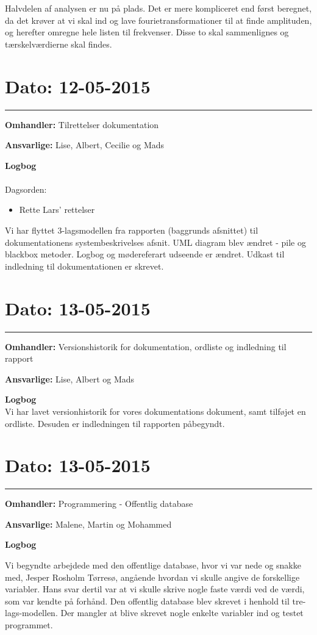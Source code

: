Halvdelen af analysen er nu på plads. Det er mere kompliceret end først beregnet, da det krøver at vi skal ind og lave fourietransformationer til at finde amplituden, og herefter omregne hele listen til frekvenser. Disse to skal sammenlignes og tærskelværdierne skal findes. 


\section{Dato: 12-05-2015}
\hrule
\textbf{Omhandler:} Tilrettelser dokumentation

\textbf{Ansvarlige:} Lise, Albert, Cecilie og Mads

\textbf{Logbog}
\\
\\
Dagsorden:
\begin{itemize}
	\item Rette Lars' rettelser
\end{itemize}

Vi har flyttet 3-lagsmodellen fra rapporten (baggrunds afsnittet) til dokumentationens systembeskrivelses afsnit. UML diagram blev ændret - pile og blackbox metoder. Logbog og mødereferart udseende er ændret. Udkast til indledning til dokumentationen er skrevet. 

\section{Dato: 13-05-2015}
\hrule
\textbf{Omhandler:} Versionshistorik for dokumentation, ordliste og indledning til rapport

\textbf{Ansvarlige:} Lise, Albert og Mads

\textbf{Logbog}
\\
Vi har lavet versionhistorik for vores dokumentations dokument, samt tilføjet en ordliste.
Desuden er indledningen til rapporten påbegyndt.

\section{Dato: 13-05-2015}
\hrule
\textbf{Omhandler:} Programmering - Offentlig database

\textbf{Ansvarlige:} Malene, Martin og Mohammed

\textbf{Logbog}

Vi begyndte arbejdede med den offentlige database, hvor vi var nede og snakke med, Jesper Rosholm Tørresø, angående hvordan vi skulle angive de forskellige variabler. Hans svar dertil var at vi skulle skrive nogle faste værdi ved de værdi, som var kendte på forhånd. Den offentlig database blev skrevet i henhold til tre-lags-modellen. Der mangler at blive skrevet nogle enkelte variabler ind og testet programmet.


